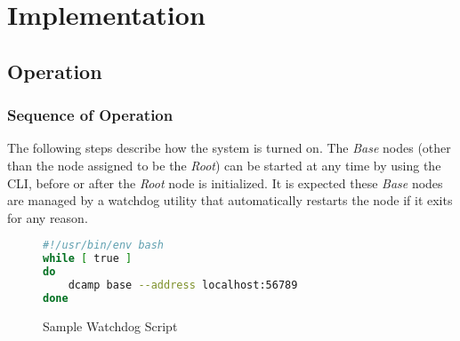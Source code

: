 \chapter{Implementation}
\label{implementation}

\section{\dcamp Operation}

\subsection{Sequence of \dcamp Operation}
\label{operation_sequnce}

The following steps describe how the \dcamp system is turned on. The \textit{Base} nodes (other than the node assigned
to be the \textit{Root}) can be started at any time by using the \dcamp CLI, before or after the \textit{Root} node is
initialized. It is expected these \textit{Base} nodes are managed by a watchdog utility that automatically restarts the
node if it exits for any reason.

\begin{figure}[H]
\vspace{+10pt}
\begin{lstlisting}[language=bash,frame=single,basicstyle=\footnotesize\ttfamily]
#!/usr/bin/env bash
while [ true ]
do
    dcamp base --address localhost:56789
done
\end{lstlisting}
\vspace{-10pt}
\caption{Sample Watchdog Script}
\label{fig:sample_watchdog}
\end{figure}


